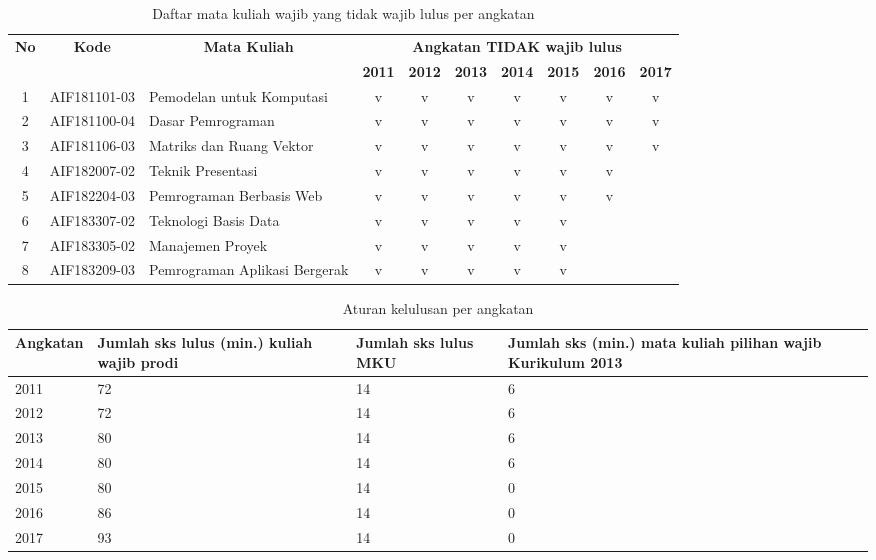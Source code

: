 \begin{table}[H]
\centering
\caption{Daftar mata kuliah wajib yang tidak wajib lulus per angkatan}
\label{tab:2_wajibtidaklulus}
\begin{tabular}{|c|c|p{3.25cm}|c|c|c|c|c|c|c|}
\hline
\multicolumn{1}{|c|}{\multirow{2}{*}{\textbf{No}}} & \multicolumn{1}{c|}{\multirow{2}{*}{\textbf{Kode}}} & \multicolumn{1}{c|}{\multirow{2}{*}{\textbf{Mata Kuliah}}} & \multicolumn{7}{c|}{\textbf{Angkatan TIDAK wajib lulus}} \\ \cline{4-10} 
\multicolumn{1}{|c|}{} & \multicolumn{1}{c|}{} & \multicolumn{1}{c|}{} & \textbf{2011} & \textbf{2012} & \textbf{2013} & \textbf{2014} & \textbf{2015} & \textbf{2016} & \textbf{2017} \\ \hline
1 & AIF181101-03 & Pemodelan untuk Komputasi & v & v & v & v & v & v & v \\ \hline
2 & AIF181100-04 & Dasar Pemrograman & v & v & v & v & v & v & v \\ \hline
3 & AIF181106-03 & Matriks dan Ruang Vektor & v & v & v & v & v & v & v \\ \hline
4 & AIF182007-02 & Teknik Presentasi & v & v & v & v & v & v &  \\ \hline
5 & AIF182204-03 & Pemrograman Berbasis Web & v & v & v & v & v & v &  \\ \hline
6 & AIF183307-02 & Teknologi Basis Data & v & v & v & v & v &  &  \\ \hline
7 & AIF183305-02 & Manajemen Proyek & v & v & v & v & v &  &  \\ \hline
8 & AIF183209-03 & Pemrograman Aplikasi Bergerak & v & v & v & v & v &  &  \\ \hline
\end{tabular}
\end{table}

\begin{table}[H]
\centering
\caption{Aturan kelulusan per angkatan}
\label{tab:AturanKelulusan}
\begin{tabular}{|p{2.5cm}|p{3.5cm}|p{3.5cm}|p{3.5cm}|}
\hline
\textbf{Angkatan} & \textbf{Jumlah sks lulus (min.) kuliah wajib prodi} & \textbf{Jumlah sks lulus MKU} & \textbf{Jumlah sks (min.) mata
kuliah pilihan wajib
Kurikulum 2013} \\ \hline
2011 & 72 & 14 & 6 \\ \hline
2012 & 72 & 14 & 6 \\ \hline
2013 & 80 & 14 & 6 \\ \hline
2014 & 80 & 14 & 6 \\ \hline
2015 & 80 & 14 & 0 \\ \hline
2016 & 86 & 14 & 0 \\ \hline
2017 & 93 & 14 & 0 \\ \hline
\end{tabular}
\end{table}

